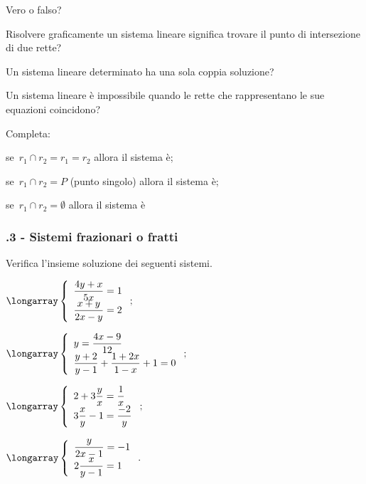 \begin{esercizio}
 \label{ese:22.42}
Vero o falso?
\TabPositions{11cm}
 \begin{enumeratea}
\item Risolvere graficamente un sistema lineare significa trovare il punto di intersezione di due rette? \tab\boxV\quad\boxF
\item Un sistema lineare determinato ha una sola coppia soluzione?\tab\boxV\quad\boxF
\item Un sistema lineare è impossibile quando le rette che rappresentano le sue equazioni coincidono?\tab\boxV\quad\boxF
\end{enumeratea}
\end{esercizio}

\begin{esercizio}
 \label{ese:22.43}
Completa:

\begin{itemize*}
\item se~$r_{1}\cap r_{2}=r_{1}=r_{2}$ allora il sistema è\dotfill;
\item se~$r_{1}\cap r_{2}=P$ (punto singolo) allora il sistema è\dotfill;
\item se~$r_{1}\cap r_{2}=\emptyset $ allora il sistema è\dotfill
\end{itemize*}
\end{esercizio}

\subsubsection*{\thechapter.3 - Sistemi frazionari o fratti}

\begin{esercizio}[\Ast]
 \label{ese:22.44}
Verifica l'insieme soluzione dei seguenti sistemi.
\begin{multicols}{2}
\begin{enumeratea}
\item $\longarray\left\{\begin{array}{l}\dfrac{4y+x}{5x}=1\\\dfrac{x+y}{2x-y}=2\end{array}\right.;$
\item $\longarray\left\{\begin{array}{l}y=\dfrac{4x-9}{12}\\{\dfrac{y+2}{y-1}+\dfrac{1+2x}{1-x}+1=0}\end{array}\right.;$
\item $\longarray\left\{\begin{array}{l}2+3\dfrac{y}{x}=\dfrac{1}{x}\\3\dfrac{x}{y}-1=\dfrac{-2}{y} \end{array}\right.;$
\item $\longarray\left\{\begin{array}{l}\dfrac{y}{2x-1}=-1\\2\dfrac{x}{y-1}=1\end{array}\right..$
\end{enumeratea}
\end{multicols}
\end{esercizio}

